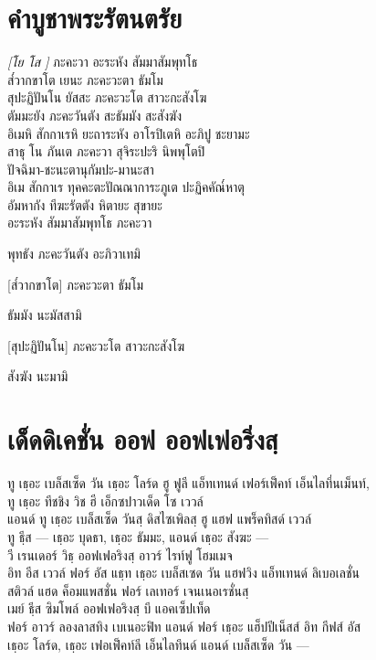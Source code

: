 \chapter*{คำบูชาพระรัตนตรัย}
\delegateSetUseNext
\textit{[โย โส ]} ภะคะวา อะระหัง สัมมาสัมพุทโธ\\
ส๎วากขาโต เยนะ ภะคะวะตา ธัมโม\\
สุปะฏิปันโน  ยัสสะ ภะคะวะโต สาวะกะสังโฆ\\
ตัมมะยัง ภะคะวันตัง สะธัมมัง สะสังฆัง\\
อิเมหิ สักกาเรหิ ยะถาระหัง อาโรปิเตหิ อะภิปู ชะยามะ\\
สาธุ โน ภันเต ภะคะวา สุจิระปะริ นิพพุโตปิ\\
ปัจฉิมา-ชะนะตานุกัมปะ-มานะสา\\
อิเม สักกาเร ทุคคะตะปัณณาการะภูเต ปะฏิคคัณ๎หาตุ\\
อัมหากัง ทีฆะรัตตัง หิตายะ สุขายะ\\

อะระหัง สัมมาสัมพุทโธ ภะคะวา\\

\begin{english}
พุทธัง ภะคะวันตัง อะภิวาเทมิ \\
\end{english}

[ส๎วากขาโต] ภะคะวะตา ธัมโม\\

\begin{english}
ธัมมัง นะมัสสามิ \\
\end{english}

[สุปะฏิปันโน] ภะคะวะโต สาวะกะสังโฆ\\

\begin{english}
สังฆัง นะมามิ \\
\end{english}

\clearpage
\chapter{เด็ดดิเคชั่น ออฟ ออฟเฟอริ่งสฺ}
ทู เธฺอะ เบล็สเซ็ด วัน เธฺอะ โลร์ด ฮู ฟูลี แอ็ทเทนด์ เฟอร์เฟ็คท์
เอ็นไลทึ่นเม็นท์,\\
ทู เธฺอะ ทีชชิง วิช ฮี เอ็กซปาวเด็ด โซ เววล์\\
แอนด์ ทู เธฺอะ เบล็สเซ็ด วันสฺ ดิสไซเพิลสฺ ฮู แฮฟ แพร็คทิสด์ เววล์\\
ทู ธีฺส — เธฺอะ บุดธา, เธฺอะ ธัมมะ, แอนด์ เธฺอะ สังฆะ —\\
วี เรนเดอร์ วิธฺ ออฟเฟอริงสฺ อาวร์ ไรท์ฟู โฮมเมจ\\
อิท อีส เววล์ ฟอร์ อัส แธฺท เธฺอะ เบล็สเซด วัน แฮฟวิง แอ็ทเทนด์ ลิเบอเลชั่น\\
สติวล์ แฮด ค็อมแพสชั่น ฟอร์ เลเทอร์ เจนเนอเรชั่นสฺ\\
เมย์ ธีฺส ซิมโพล์ ออฟเฟอริงสฺ บี แอคเซ็ปเท็ด\\
ฟอร์ อาวร์ ลองลาสทิง เบเนอะฟิท แอนด์ ฟอร์ เธฺอะ แฮ็ปปีเน็สส์ อิท กีฟส์ อัส\\
เธฺอะ โลร์ด, เธฺอะ เฟอเฟ็คท์ลี เอ็นไลทึนด์ แอนด์ เบล็สเซ็ด วัน —\\

